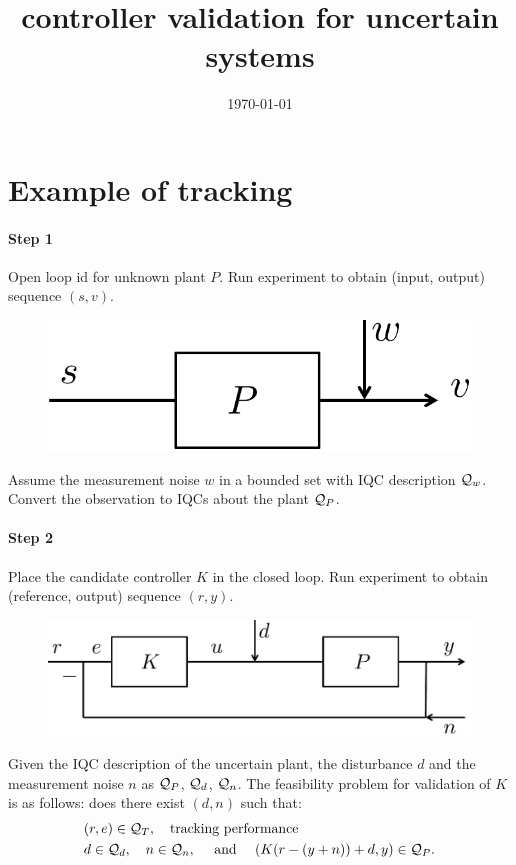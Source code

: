 \documentclass[11pt, onecolumn]{article}
\begin{document}
\title{controller validation for uncertain systems}
\date{\today}



\setcounter{page}{1}

\section{Example of tracking}

\paragraph{Step 1}
Open loop id for unknown plant $P$. Run experiment to obtain (input, output) sequence
$(s,v)$.
\begin{figure}[h!]
  \centering
  \includegraphics[width=.3\linewidth]{sys3.pdf}
\end{figure}


Assume the measurement noise $w$ in a bounded set with IQC description $\mathcal Q_w$. Convert the
observation to IQCs about the plant $\mathcal Q_P$.

\paragraph{Step 2}
Place the candidate controller $K$ in the closed loop. Run experiment to obtain (reference, output)
sequence $(r, y)$.
\begin{figure}[h!]
  \centering
  \includegraphics[width=.5\linewidth]{sys2.pdf}
\end{figure}


Given the IQC description of the uncertain plant, the disturbance $d$ and the measurement noise $n$
as $\mathcal Q_P$, $\mathcal Q_d$, $\mathcal Q_n$.  The feasibility problem for validation of $K$ is as follows:
does there exist $(d, n)$ such that:
\begin{align*}
  & (r,e)\in\mathcal Q_{T}, \quad\text{tracking performance}
  \\
  & d\in\mathcal Q_d, \quad n\in\mathcal Q_n, \quad \text{ and } \quad (K (r- (y+n)) + d, y )\in\mathcal Q_P.
\end{align*}
\end{document}
